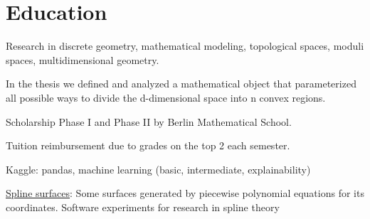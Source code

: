 \documentclass[]{plushcv}
\begin{document}
\begin{minipage}[t]{0.70\textwidth}


\section{Education} 
\begin{tightemize}
\item Research in discrete geometry, mathematical modeling, topological spaces, moduli spaces, multidimensional geometry.
\item In the thesis we defined and analyzed a mathematical object that parameterized all possible ways to divide the d-dimensional space into n convex regions.
  \item Scholarship Phase I and Phase II by Berlin Mathematical School.\end{tightemize}
\sectionsep

\begin{tightemize}
\item Tuition reimbursement due to grades on the top 2 each semester.\\
\end{tightemize}


\location{}
\begin{tightemize}
\item Kaggle: pandas, machine learning (basic, intermediate, explainability)
\end{tightemize}


\sectionsep
{}
\begin{tightemize}
\sectionsep
\item  \href{https://emersonjleon.pythonanywhere.com/visualization}{Spline surfaces}: Some surfaces generated by piecewise polynomial equations for its coordinates. Software experiments for research in spline theory  



\end{tightemize}
\end{minipage}
\end{document}
